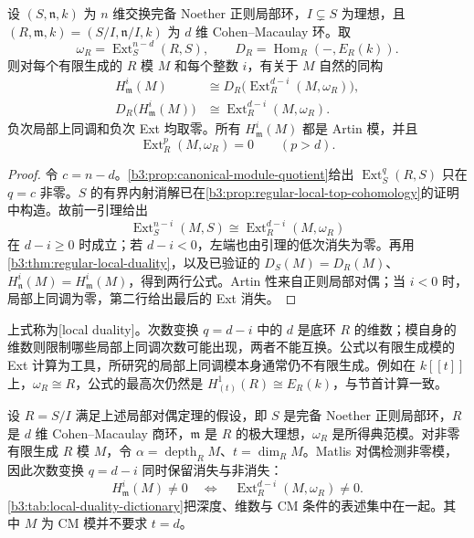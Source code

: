\begin{theorem}[局部对偶]\label{b3:thm:canonical-module-local-duality}
	设 \((S,\mathfrak n,k)\) 为 \(n\) 维交换完备 Noether 正则局部环，\(I\subsetneq S\) 为理想，且 \((R,\mathfrak m,k)=(S/I,\mathfrak n/I,k)\) 为 \(d\) 维 Cohen–Macaulay 环。取
	\[
		\omega_R=\operatorname{Ext}_S^{n-d}(R,S), \qquad D_R=\operatorname{Hom}_R(-,E_R(k)).
	\]
	则对每个有限生成的 \(R\) 模 \(M\) 和每个整数 \(i\)，有关于 \(M\) 自然的同构
	\begin{equation}\label{b3:eq:canonical-local-duality}
		\begin{aligned}
			H^i_{\mathfrak m}(M) &\cong D_R\bigl(\operatorname{Ext}_R^{d-i}(M,\omega_R)\bigr),\\
			D_R\bigl(H^i_{\mathfrak m}(M)\bigr) &\cong\operatorname{Ext}_R^{d-i}(M,\omega_R).
		\end{aligned}
	\end{equation}
	负次局部上同调和负次 Ext 均取零。所有 \(H^i_{\mathfrak m}(M)\) 都是 Artin 模，并且
	\[
		\operatorname{Ext}_R^p(M,\omega_R)=0\qquad(p>d).
	\]
\end{theorem}
\begin{proof}
	令 \(c=n-d\)。\cref{b3:prop:canonical-module-quotient}给出 \(\operatorname{Ext}_S^q(R,S)\) 只在 \(q=c\) 非零。\(S\) 的有界内射消解已在\cref{b3:prop:regular-local-top-cohomology}的证明中构造。故前一引理给出
	\[
		\operatorname{Ext}_S^{n-i}(M,S) \cong\operatorname{Ext}_R^{d-i}(M,\omega_R)
	\]
	在 \(d-i\ge0\) 时成立；若 \(d-i<0\)，左端也由引理的低次消失为零。再用\cref{b3:thm:regular-local-duality}，以及已验证的 \(D_S(M)=D_R(M)\)、\(H^i_{\mathfrak n}(M)=H^i_{\mathfrak m}(M)\)，得到两行公式。Artin 性来自正则局部对偶；当 \(i<0\) 时，局部上同调为零，第二行给出最后的 Ext 消失。
\end{proof}

上式称为[local duality]。次数变换 \(q=d-i\) 中的 \(d\) 是底环 \(R\) 的维数；模自身的维数则限制哪些局部上同调次数可能出现，两者不能互换。公式以有限生成模的 Ext 计算为工具，所研究的局部上同调模本身通常仍不有限生成。例如在 \(k[\![t]\!]\) 上，\(\omega_R\cong R\)，公式的最高次仍然是 \(H^1_{(t)}(R)\cong E_R(k)\)，与节首计算一致。

\ProseParagraphBreak
设 \(R=S/I\) 满足上述局部对偶定理的假设，即 \(S\) 是完备 Noether 正则局部环，\(R\) 是 \(d\) 维 Cohen–Macaulay 商环，\(\mathfrak m\) 是 \(R\) 的极大理想，\(\omega_R\) 是所得典范模。对非零有限生成 \(R\) 模 \(M\)，令 \(\alpha=\operatorname{depth}_R M\)、\(t=\dim_R M\)。Matlis 对偶检测非零模，因此次数变换 \(q=d-i\) 同时保留消失与非消失：
\[
	H^i_{\mathfrak m}(M)\ne0 \quad\Longleftrightarrow\quad \operatorname{Ext}_R^{d-i}(M,\omega_R)\ne0.
\]
\cref{b3:tab:local-duality-dictionary}把深度、维数与 CM 条件的表述集中在一起。其中 \(M\) 为 CM 模并不要求 \(t=d\)。


